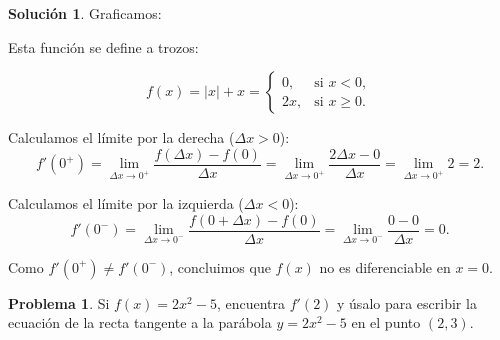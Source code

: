 \documentclass{article}
\theoremstyle{definition}
\newtheorem{problem}{Problema}
\newtheorem*{solution}{Solución}
\begin{document}
\medskip

\begin{solution}

Graficamos:

\begin{center}
\end{center}

Esta función se define a trozos:

\[
f(x) = |x| + x =
\begin{cases}
0, & \text{si } x < 0,\\
2x, & \text{si } x \ge 0.
\end{cases}
\]

Calculamos el límite por la derecha (\( \Delta x > 0 \)):
\[
f'(0^+) = \lim_{\Delta x\to 0^+}\frac{f(\Delta x)-f(0)}{\Delta x}
= \lim_{\Delta x\to 0^+}\frac{2\Delta x-0}{\Delta x}
= \lim_{\Delta x\to 0^+} 2 = 2.
\]

Calculamos el límite por la izquierda (\( \Delta x < 0 \)):
\[
f'(0^-) = \lim_{\Delta x\to 0^-}\frac{f(0+\Delta x)-f(0)}{\Delta x}
= \lim_{\Delta x\to 0^-}\frac{0-0}{\Delta x}
= 0.
\]

Como \( f'(0^+) \neq f'(0^-) \), concluimos que \( f(x) \) no es diferenciable en \( x = 0 \).

\end{solution}

\bigskip

\begin{problem}
Si \( f(x) = 2x^2 - 5 \), encuentra \( f'(2) \) y úsalo para escribir la ecuación de la recta tangente a la parábola \( y = 2x^2 - 5 \) en el punto \( (2,3) \).
\end{problem}

\medskip
\end{document}
